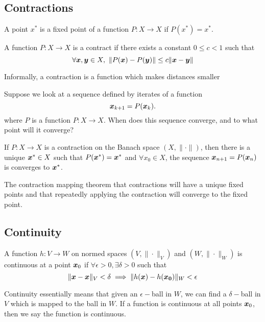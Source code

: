 \subsection{Contractions}
\begin{definition}
	A point $x^*$ is a fixed point of a function $P:X\to X$ if $P(x^*)=x^*$.
	\label{defn:fixed-point}
\end{definition}
\begin{definition}
	A function $P:X\to X$ is a contract if there exists a constant $0\leq c < 1$
	such that \[
		\forall \bs{x},\bs{y}\in X,\ \|P(\bs{x}) - P(\bs{y})\| \leq c
		\|\bs{x}-\bs{y}\|
	\]
	\label{defn:contraction}
\end{definition}
Informally, a contraction is a function which makes distances smaller 

Suppose we look at a sequence defined by iterates of a function \[
	\boldsymbol{x}_{k+1} = P(\boldsymbol{x}_k).
\]
where $P$ is a function $P:X\to X$. When does this sequence converge, and to
what point will it converge?
\begin{theorem}
	If $P:X\to X$ is a contraction on the Banach space $(X, \|\cdot\|)$, then
	there is a unique $\boldsymbol{x}^*\in X$ such that $P(\boldsymbol{x}^*) = \boldsymbol{x}^*$ and
	$\forall x_0\in X$, the sequence $\boldsymbol{x}_{n+1} = P(\boldsymbol{x}_n)$ is converges to
	$\boldsymbol{x}^*$.
	\label{thm:contraction-mapping}
\end{theorem}
The contraction mapping theorem that contractions will have a unique fixed
points and that repeatedly applying the contraction will converge to the fixed
point.

\subsection{Continuity}
\begin{definition}
	A function $h:V\to W$ on normed spaces $(V, \|\cdot\|_V)$ and $(W,
	\|\cdot\|_W)$ is continuous at a point $\boldsymbol{x}_0$ if $\forall \epsilon > 0,
	\exists \delta > 0$ such that \[
		\|\boldsymbol{x}-\boldsymbol{x}\|_V < \delta \implies \|h(\boldsymbol{x}) - h(\boldsymbol{x_0})\|_W < \epsilon
	\]
	\label{thm:continuity}
\end{definition}
Continuity essentially means that given an $\epsilon-$ball in $W$, we can find a
$\delta-$ball in $V$ which is mapped to the ball in $W$.
If a function is continuous at all points $\boldsymbol{x}_0$, then we say the function
is continuous.

